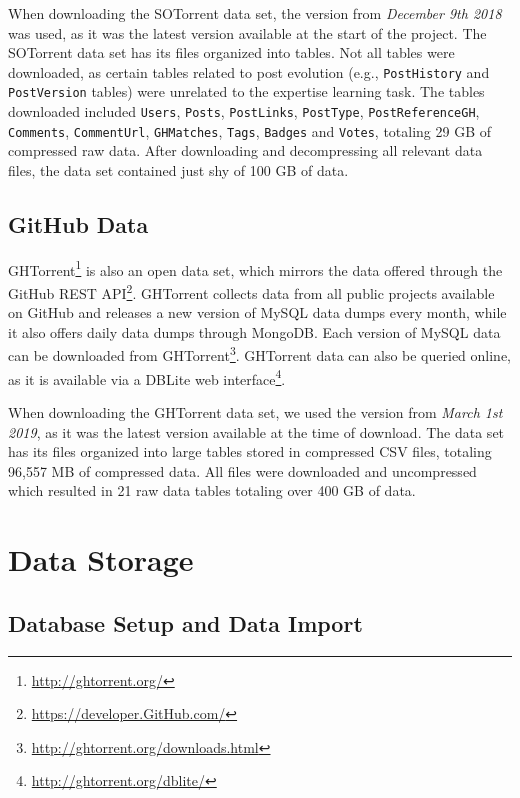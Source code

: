         When downloading the SOTorrent data set, the version from \textit{December 9th 2018} was used, as it was the latest version available at the start of the project. The SOTorrent data set has its files organized into tables. Not all tables were downloaded, as certain tables related to post evolution (e.g., \texttt{PostHistory} and \texttt{PostVersion} tables) were unrelated to the expertise learning task. The tables downloaded included \texttt{Users}, \texttt{Posts}, \texttt{PostLinks}, \texttt{PostType}, \texttt{PostReferenceGH}, \texttt{Comments}, \texttt{CommentUrl}, \texttt{GHMatches}, \texttt{Tags}, \texttt{Badges} and \texttt{Votes}, totaling 29 GB of compressed raw data. After downloading and decompressing all relevant data files, the data set contained just shy of 100 GB of data.
        
    \subsection{GitHub Data}
    
        GHTorrent\footnote{\label{GHTOrrent}\url{http://ghtorrent.org/}} is also an open data set, which mirrors the data offered through the GitHub REST API\footnote{\url{https://developer.GitHub.com/}}. GHTorrent collects data from all public projects available on GitHub and releases a new version of MySQL data dumps every month, while it also offers daily data dumps through MongoDB. Each version of MySQL data can be downloaded from GHTorrent\footnote{\label{GH_dowload}\url{http://ghtorrent.org/downloads.html}}. GHTorrent data can also be queried online, as it is available via a DBLite web interface\footnote{\label{GH_query}\url{http://ghtorrent.org/dblite/}}. 
            
        When downloading the GHTorrent data set, we used the version from \textit{March 1st 2019}, as it was the latest version available at the time of download. The data set has its files organized into large tables stored in compressed CSV files, totaling 96,557 MB of compressed data. All files were downloaded and uncompressed which resulted in 21 raw data tables totaling over 400 GB of data.

\section{Data Storage} \label{sec:data_storage}

    \subsection{Database Setup and Data Import}
        
